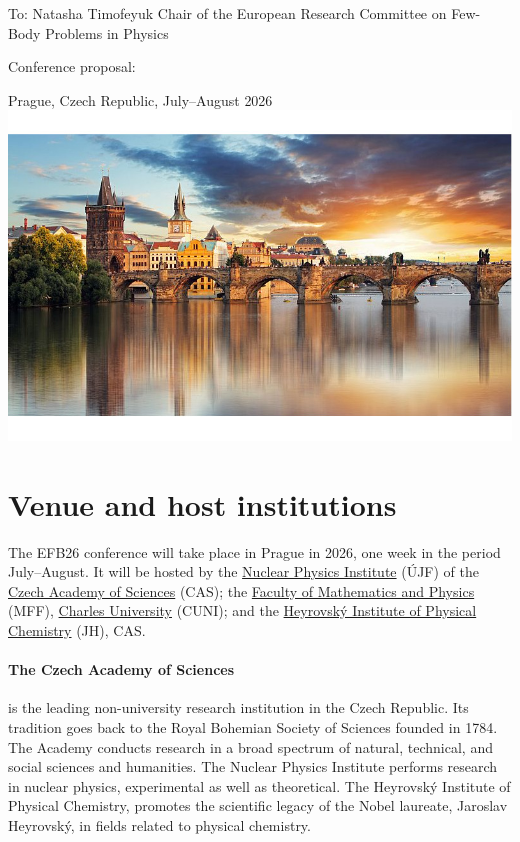 \documentclass[12pt]{extarticle}
\begin{document}
\color{C0}


\noindent
To: Natasha Timofeyuk \newline
Chair of the European Research Committee \newline
on Few-Body Problems in Physics

\bigskip
\noindent
\doublespacing
  \noindent
  {\Large Conference proposal:}

  \bigskip
\doublespacing
{} \newline
{\Large Prague, Czech Republic, July--August 2026}\\
\includegraphics[width=1.0\textwidth]{Prague_foto_cut}

\onehalfspacing
\section*{Venue and host institutions}
\noindent
The EFB26 conference will take place in Prague in 2026, one week in
the period July--August. It will be hosted by the
\href{http://www.ujf.cas.cz/en/}{Nuclear Physics Institute} (ÚJF)
of the
\href{https://www.avcr.cz/en/}{Czech Academy of Sciences} (CAS); the
\href{https://www.mff.cuni.cz/en}{Faculty of Mathematics and
  Physics} (MFF), \href{https://cuni.cz/UKEN-1.html}{Charles
  University} (CUNI);
and the
\href{https://www.jh-inst.cas.cz/}{Heyrovský Institute of Physical
  Chemistry} (JH), CAS.

\paragraph{The Czech Academy of Sciences} is the leading
non-university research institution in the Czech Republic. Its
tradition goes back to the Royal Bohemian Society of Sciences founded
in 1784. The Academy conducts research in a broad spectrum of natural,
technical, and social sciences and humanities. The Nuclear Physics
Institute performs research in nuclear physics, experimental as well
as theoretical. The Heyrovský Institute of Physical Chemistry,
promotes the scientific legacy of the Nobel laureate, Jaroslav
Heyrovský, in fields related to physical chemistry.
\end{document}
